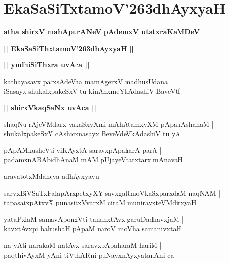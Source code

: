 \documentclass[twoside,12pt,openright]{book}
\def\S{\char'263}
\newcounter{shloka}[chapter]
\def\uvaca#1{\centerline{{\large\textbf{#1}}}}
\begin{document}
\chapter{EkaSaSiTxtamoV\S dhAyxyaH}

\begin{center}
{\LARGE\bfseries atha shirxV mahApurANeV pAdemxV utatxraKaMDeV}
\end{center}

\begin{center}
{\LARGE\bfseries || EkaSaSiThxtamoV\S dhAyxyaH ||}
\end{center}

\uvaca{|| yudhiSiThxra uvAca ||}

\begin{shloka}%
kathayasavx parxsAdeVna mamAgerxV madhusUdana |\\
iSasayx shukalxpakeSxV tu kinAnxmeYkAdashiV BaveVtf 
\end{shloka}

\uvaca{|| shirxVkaqSaNx uvAca ||}

\begin{shloka}%
shaqNu rAjeVMdarx vakaSxyXmi mAhAtamxyXM pApanAshanaM |\\
shukalxpakeSxV cAshicxnasayx BeveVdeVkAdashiV tu yA 
\end{shloka}

\begin{shloka}%
pApAMkusheVti viKAyxtA saravxpApaharA parA |\\
padamxnABAbidhAnaM mAM pUjayeVtatxtarx mAnavaH 
\end{shloka}

\begin{center}
aravatotxMdaneya adhAyxyavu
\end{center}

\begin{shloka}%
sarvxBiVSaTxPalapArxpetxyXY savxgaRmoVkaSxparxdaM naqNAM |\\
tapasatxpAtxvX punasitxVvarxM ciraM munirayxteVMdirxyaH 
\end{shloka}

\begin{shloka}%
yataPxlaM samavAponxVti tananxtAvx garuDadhavxjaM |\\
kavxtAvxpi bahushaH pApaM naroV moVha samanivxtaH 
\end{shloka}

\begin{shloka}%
na yAti narakaM natAvx saravxpApaharaM hariM |\\
paqthivAyxM yAni tiVthARni puNayxnAyxyatanAni ca 
\end{shloka}
\end{document}
